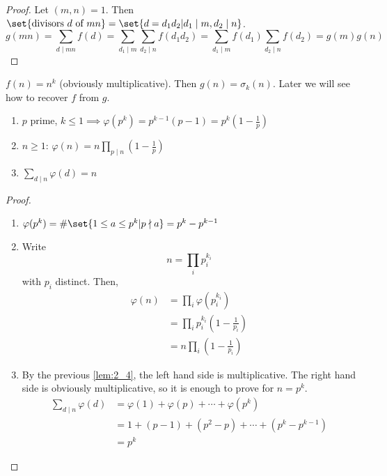 \documentclass{article}
\begin{document}
\begin{proof}
    Let $(m, n) = 1$.
    Then $\set{ \text{divisors } d \text{ of } mn } = \set{ d = d_1 d_2 | d_1 \mid m, d_2 \mid n }$.
    \begin{equation*}
        g(mn) = \sum_{d \mid mn} f(d) = \sum_{d_1 \mid m} \sum_{d_2 \mid n} f(d_1 d_2) = \sum_{d_1 \mid m} f(d_1) \sum_{d_2 \mid n} f(d_2) = g(m)g(n)
    \end{equation*}
\end{proof}

\begin{eg}
    $f(n) = n^k$ (obviously multiplicative). Then $g(n) = \sigma_k(n)$.
    Later we will see how to recover $f$ from $g$.
\end{eg}

\begin{nthm}\label{thm:2_5}
    \leavevmode
    \begin{enumerate}[label=(\roman*)]
        \item $p$ prime, $k \leq 1 \implies \varphi(p^k) = p^{k-1} (p-1) = p^k \left(1-\frac{1}{p}\right)$
        \item $n \geq 1$: $\varphi (n) = n \prod_{p \mid n}\left( 1-\frac{1}{p} \right)$
        \item $\sum_{d \mid n} \varphi(d) = n$
    \end{enumerate}
\end{nthm}

\begin{proof}
    \leavevmode
    \begin{enumerate}[label=(\roman*)]
        \item $\varphi (p^k) = \# \set{ 1 \leq a \leq p^k | p \nmid a } = p^k - p^{k-1}$
        \item Write
            \begin{equation*}
                n = \prod_i p_i^{k_i}
            \end{equation*}
            with $p_i$ distinct. Then,
            \begin{align*}
                \varphi (n) &= \prod_i \varphi (p_i^{k_i}) \\%
                            &= \prod_i p_i^{k_i} \left(1 - \frac{1}{p_i}\right) \\
                            &= n \prod_i \left(1 - \frac{1}{p_i} \right)
            \end{align*}
        \item By the previous \cref{lem:2_4}, the left hand side is multiplicative. The right hand side is obviously multiplicative, so it is enough to prove for $n = p^k$.
            \begin{align*}
                \sum_{d \mid n} \varphi(d) &= \varphi(1) + \varphi(p) + \dotsb + \varphi(p^k) \\
                                       &= 1 + (p - 1) + (p^2 - p) + \dotsb + (p^k - p^{k-1}) \\
                                       &= p^k
            \end{align*}
    \end{enumerate}
\end{proof}
\end{document}
